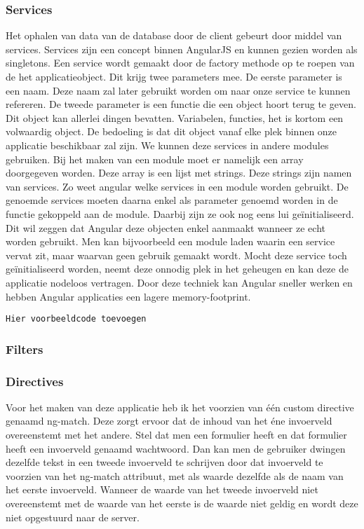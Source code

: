 \documentclass[a4paper,11pt]{article}
\begin{document}
\subsubsection{Services}
Het ophalen van data van de database door de client gebeurt door middel van services. Services zijn een concept binnen AngularJS en kunnen gezien worden als singletons. Een service wordt gemaakt door de factory methode op te roepen van de het applicatieobject. Dit krijg twee parameters mee. De eerste parameter is een naam. Deze naam zal later gebruikt worden om naar onze service te kunnen refereren. De tweede parameter is een functie die een object hoort terug te geven. Dit object kan allerlei dingen bevatten. Variabelen, functies, het is kortom een volwaardig object. De bedoeling is dat dit object vanaf elke plek binnen onze applicatie beschikbaar zal zijn. We kunnen deze services in andere modules gebruiken. Bij het maken van een module moet er namelijk een array doorgegeven worden. Deze array is een lijst met strings. Deze strings zijn namen van services. Zo weet angular welke services in een module worden gebruikt. De genoemde services moeten daarna enkel als parameter genoemd worden in de functie gekoppeld aan de module. Daarbij zijn ze ook nog eens lui geïnitialiseerd. Dit wil zeggen dat Angular deze objecten enkel aanmaakt wanneer ze echt worden gebruikt. Men kan bijvoorbeeld een module laden waarin een service vervat zit, maar waarvan geen gebruik gemaakt wordt. Mocht deze service toch geïnitialiseerd worden, neemt deze onnodig plek in het geheugen en kan deze de applicatie nodeloos vertragen. Door deze techniek kan Angular sneller werken en hebben Angular applicaties een lagere memory-footprint.

\begin{verbatim}
Hier voorbeeldcode toevoegen
\end{verbatim}

\subsubsection{Filters}

\subsubsection{Directives}
Voor het maken van deze applicatie heb ik het voorzien van één custom directive genaamd ng-match. Deze zorgt ervoor dat de inhoud van het éne invoerveld overeenstemt met het andere. Stel dat men een formulier heeft en dat formulier heeft een invoerveld genaamd wachtwoord. Dan kan men de gebruiker dwingen dezelfde tekst in een tweede invoerveld te schrijven door dat invoerveld te voorzien van het ng-match attribuut, met als waarde dezelfde als de naam van het eerste invoerveld. Wanneer de waarde van het tweede invoerveld niet overeenstemt met de waarde van het eerste is de waarde niet geldig en wordt deze niet opgestuurd naar de server.
\end{document}
